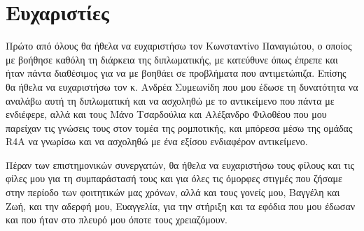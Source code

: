 \section*{Ευχαριστίες}
{}

Πρώτο από όλους θα ήθελα να ευχαριστήσω τον Κωνσταντίνο Παναγιώτου, ο οποίος με βοήθησε καθόλη τη διάρκεια της διπλωματικής, με κατεύθυνε όπως έπρεπε και ήταν πάντα διαθέσιμος για να με βοηθάει σε προβλήματα που αντιμετώπιζα. Επίσης θα ήθελα να ευχαριστήσω τον κ. Ανδρέα Συμεωνίδη που μου έδωσε τη δυνατότητα να αναλάβω αυτή τη διπλωματική και να ασχοληθώ με το αντικείμενο που πάντα με ενδιέφερε, αλλά και τους Μάνο Τσαρδούλια και Αλέξανδρο Φιλοθέου που μου παρείχαν τις γνώσεις τους στον τομέα της ρομποτικής, και μπόρεσα μέσω της ομάδας R4A να γνωρίσω και να ασχοληθώ με ένα εξίσου ενδιαφέρον αντικείμενο.

Πέραν των επιστημονικών συνεργατών, θα ήθελα να ευχαριστήσω τους φίλους και τις φίλες μου για τη συμπαράστασή τους και για όλες τις όμορφες στιγμές που ζήσαμε στην περίοδο των φοιτητικών μας χρόνων, αλλά και τους γονείς μου, Βαγγέλη και Ζωή, και την αδερφή μου, Ευαγγελία, για την στήριξη και τα εφόδια που μου έδωσαν και που ήταν στο πλευρό μου όποτε τους χρειαζόμουν.
